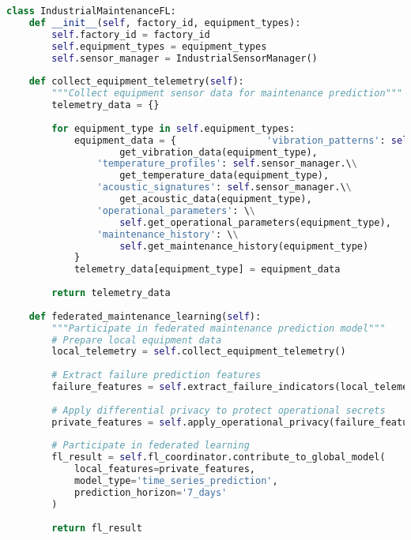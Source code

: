 \begin{lstlisting}[language=python, caption=Industrial IoT FL Implementation]
class IndustrialMaintenanceFL:
    def __init__(self, factory_id, equipment_types):
        self.factory_id = factory_id
        self.equipment_types = equipment_types
        self.sensor_manager = IndustrialSensorManager()
        
    def collect_equipment_telemetry(self):
        """Collect equipment sensor data for maintenance prediction"""
        telemetry_data = {}
        
        for equipment_type in self.equipment_types:
            equipment_data = {                'vibration_patterns': self.sensor_manager.\\
                    get_vibration_data(equipment_type),
                'temperature_profiles': self.sensor_manager.\\
                    get_temperature_data(equipment_type),
                'acoustic_signatures': self.sensor_manager.\\
                    get_acoustic_data(equipment_type),
                'operational_parameters': \\
                    self.get_operational_parameters(equipment_type),
                'maintenance_history': \\
                    self.get_maintenance_history(equipment_type)
            }
            telemetry_data[equipment_type] = equipment_data
            
        return telemetry_data
        
    def federated_maintenance_learning(self):
        """Participate in federated maintenance prediction model"""
        # Prepare local equipment data
        local_telemetry = self.collect_equipment_telemetry()
        
        # Extract failure prediction features
        failure_features = self.extract_failure_indicators(local_telemetry)
        
        # Apply differential privacy to protect operational secrets
        private_features = self.apply_operational_privacy(failure_features)
        
        # Participate in federated learning
        fl_result = self.fl_coordinator.contribute_to_global_model(
            local_features=private_features,
            model_type='time_series_prediction',
            prediction_horizon='7_days'
        )
        
        return fl_result
\end{lstlisting}

